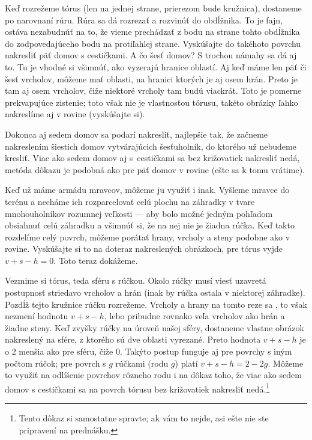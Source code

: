 \documentclass[a4paper]{article}
\begin{document}
Keď rozrežeme tórus (len na jednej strane, prierezom bude kružnica), dostaneme po narovnaní rúru. Rúra sa dá rozrezať a rozvinúť do obdĺžnika. To je fajn, ostáva nezabudnúť na to, že vieme prechádzať z bodu na strane tohto obdĺžnika do zodpovedajúceho bodu na protiľahlej strane. Vyskúšajte do takéhoto povrchu nakresliť päť domov s cestičkami. A čo šesť domov? S trochou námahy sa dá aj to.
Tu je vhodné si všimnúť, ako vyzerajú hranice oblastí. Aj keď máme len päť či šesť vrcholov, môžeme mať oblasti, na hranici ktorých je aj osem hrán. Preto je tam aj osem vrcholov, čiže niektoré vrcholy tam budú viackrát. Toto je pomerne prekvapujúce zistenie; toto však nie je vlastnosťou tórusu, takéto obrázky ľahko nakreslíme aj v rovine (vyskúšajte si).

Dokonca aj sedem domov sa podarí nakresliť, najlepšie tak, že začneme nakreslením šiestich domov vytvárajúcich šesťuholník, do ktorého už nebudeme kresliť. Viac ako sedem domov aj s~cestičkami sa bez križovatiek nakresliť nedá, metóda dôkazu je podobná ako pre päť domov v rovine (ešte sa k tomu vrátime).

Keď už máme armádu mravcov, môžeme ju využiť i inak. Vyšleme mravce do terénu a necháme ich rozparcelovať celú plochu na záhradky v tvare mnohouholníkov rozumnej veľkosti --- aby bolo možné jedným pohľadom obsiahnuť celú záhradku a všimnúť si, že na nej nie je žiadna rúčka. Keď takto rozdelíme celý povrch, môžeme porátať hrany, vrcholy a steny podobne ako v rovine. Vyskúšajte si to na doteraz nakreslených obrázkoch, pre tórus vyjde $v+s-h = 0$. Toto teraz dokážeme.

Vezmime si tórus, teda sféru s rúčkou. Okolo rúčky musí viesť uzavretá postupnosť striedavo vrcholov a hrán (inak by rúčka ostala v niektorej záhradke). Pozdĺž tejto kružnice rúčku rozrežeme. Vrcholy a hrany na tomto reze sa , to však nezmení hodnotu $v+s-h$, lebo pribudne rovnako veľa vrcholov ako hrán a žiadne steny. Keď zvyšky rúčky  na úroveň našej sféry, dostaneme vlastne obrázok nakreslený na sfére, z ktorého sú dve oblasti vyrezané. Preto hodnota $v+s-h$ je o $2$ menšia ako pre sféru, čiže $0$. Takýto postup funguje aj pre povrchy s iným počtom rúčok; pre povrch s $g$ rúčkami (rodu $g$) platí $v+s-h=2-2g$.
Môžeme to využiť na odlíšenie povrchov rôzneho rodu i na dôkaz toho, že viac ako sedem domov s cestičkami sa na povrch tórusu bez križovatiek nakresliť nedá.\footnote{Tento dôkaz si samostatne spravte; ak vám to nejde, asi ešte nie ste pripravení na prednášku.}
\end{document}
